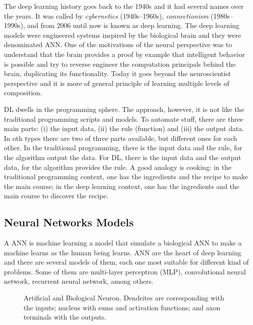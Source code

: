 The deep learning history goes back to the 1940s and it had several names over the years. 
It was called by \emph{cybernetics} (1940s--1960s), \emph{connectionism} (1980s--1990s), and from 2006 until now is known as deep learning.
The deep learning models were engineered systems inspired by the biological brain and they were denominated ANN.
One of the motivations of the neural  perspective was to understand that the brain provides a proof by example that intelligent behavior is possible and try to reverse engineer the computation principals behind the brain, duplicating its functionality.
Today it goes beyond the neuroscientist perspective and it is more of general principle of learning multiple levels of composition.

DL dwells in the programming sphere. 
The approach, however, it is not like the traditional programming scripts and models. 
To automate stuff, there are three main parts: (i) the input data, (ii) the rule (function) and (iii) the output data. 
In oth types there are two of three parts available, but different ones for each other. 
In the traditional programming, there is the input data and the rule, for the algorithm output the data. 
For DL, there is the input data and the output data, for the algorithm provides the rule. 
A good analogy is cooking: in the traditional programming context, one has the ingredients and the recipe to make the main course; in the deep learning context, one has the ingredients and the main course to discover the recipe.

\subsection{Neural Networks Models}\label{sec:nn_models}

A ANN is machine learning a model that simulate a biological ANN to make a machine learns as the human being learns.
ANN are the heart of deep learning and there are several models of them, each one most suitable for different kind of problems.
Some of them are multi-layer perceptron (MLP), convolutional neural network, recurrent neural network, among others.

\begin{figure}[htb]
    \centering
    \caption[Artificial and Biological Neuron]{Artificial and Biological Neuron. Dendrites are corresponding with the inputs; nucleus with sums and activation functions; and axon terminals with the outputs.}
    
\end{figure}
